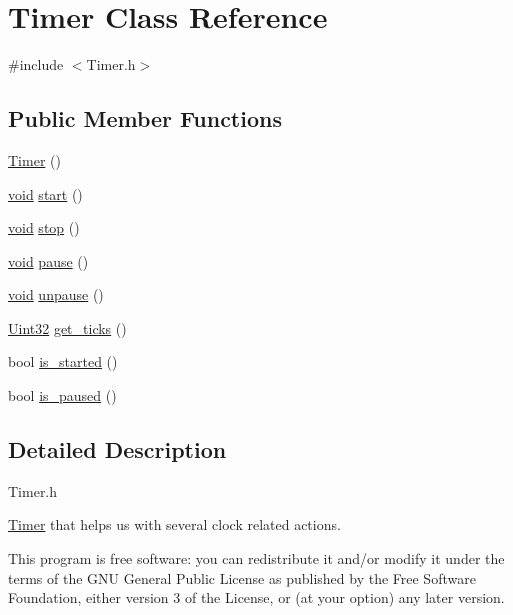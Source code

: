 \hypertarget{class_timer}{\section{Timer Class Reference}
\label{class_timer}
}


{\ttfamily \#include $<$Timer.\-h$>$}

\subsection*{Public Member Functions}
\begin{DoxyCompactItemize}
\item 
\hyperlink{class_timer_a5f16e8da27d2a5a5242dead46de05d97}{Timer} ()
\item 
\hyperlink{_s_d_l__opengl_8h_a3db05964a3cc4410f35b7ea2b7eb850d}{void} \hyperlink{class_timer_a3a8b5272198d029779dc9302a54305a8}{start} ()
\item 
\hyperlink{_s_d_l__opengl_8h_a3db05964a3cc4410f35b7ea2b7eb850d}{void} \hyperlink{class_timer_a63f0eb44b27402196590a03781515dba}{stop} ()
\item 
\hyperlink{_s_d_l__opengl_8h_a3db05964a3cc4410f35b7ea2b7eb850d}{void} \hyperlink{class_timer_a0289effad7b573c508bc27e405900a23}{pause} ()
\item 
\hyperlink{_s_d_l__opengl_8h_a3db05964a3cc4410f35b7ea2b7eb850d}{void} \hyperlink{class_timer_aa4dd50d7ed48ac73efed2950749d35d6}{unpause} ()
\item 
\hyperlink{_s_d_l__stdinc_8h_add440eff171ea5f55cb00c4a9ab8672d}{Uint32} \hyperlink{class_timer_a19c45b0fde7266bf940754c52486e62c}{get\-\_\-ticks} ()
\item 
bool \hyperlink{class_timer_a8aabbd05a0fc030e7156b01bcd8264db}{is\-\_\-started} ()
\item 
bool \hyperlink{class_timer_a18c977688b4e0809cb603e9abb265950}{is\-\_\-paused} ()
\end{DoxyCompactItemize}


\subsection{Detailed Description}
Timer.\-h

\hyperlink{class_timer}{Timer} that helps us with several clock related actions.

This program is free software\-: you can redistribute it and/or modify it under the terms of the G\-N\-U General Public License as published by the Free Software Foundation, either version 3 of the License, or (at your option) any later version.

